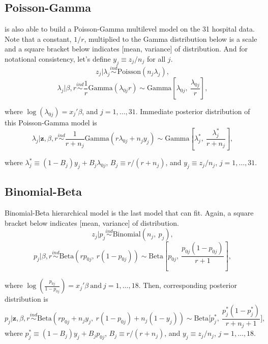 \documentclass[article]{jss}
\begin{document}
\subsection[Poisson-Gamma]{Poisson-Gamma}
 is also able to build a Poisson-Gamma multilevel model on the 31 hospital data. Note that a constant, $1/r$, multiplied to the Gamma distribution below is a scale and a square bracket below indicates [mean, variance] of distribution. And for notational consistency, let's define $y_{j}\equiv z_{j} / n_{j}$ for all $j$.
\begin{equation}
z_{j}\vert \lambda_{j} \stackrel{ind}{\sim}\textrm{Poisson}(n_{j}\lambda_{j}),
\end{equation}
\begin{equation}
\lambda_{j}\vert \beta, r\stackrel{ind}{\sim}\frac{1}{r}\textrm{Gamma}(\lambda_{0j}r)\sim \textrm{Gamma}[\lambda_{0j}, ~\frac{\lambda_{0j}}{r}],
\end{equation}

where $\log(\lambda_{0j}) =x_{j}'\beta$, and $j=1, \ldots, 31$. Immediate posterior distribution of this Poisson-Gamma model is
\begin{equation}
\lambda_{j}\vert \textbf{z}, \beta, r \stackrel{ind}{\sim}\frac{1}{r + n_{j}}\textrm{Gamma}(r\lambda_{0j} + n_{j}y_{j})\sim\textrm{Gamma}[\lambda^{\ast}_{j},~\frac{\lambda^{\ast}_{j}}{r+n_{j}}],
\end{equation}

where $\lambda^{\ast}_{j} \equiv (1-B_{j})y_{j} + B_{j}\lambda_{0j}$,  $B_{j}\equiv r / (r+n_{j})$, and $y_{j}\equiv z_{j} / n_{j}$, $j=1, \ldots, 31$. 

\subsection[Binomial-Beta]{Binomial-Beta}
Binomial-Beta hierarchical model is the last model that  can fit. Again, a square bracket below indicates [mean, variance] of distribution.
\begin{equation}
z_{j} \vert p_{j}\stackrel{ind}{\sim}\textrm{Binomial}(n_{j}, ~p_{j}),
\end{equation}
\begin{equation}
p_{j} \vert \beta, r\stackrel{ind}{\sim}\textrm{Beta}(rp_{0j},~ r(1-p_{0j}))\sim \textrm{Beta}[p_{0j}, ~\frac{p_{0j}(1-p_{0j})}{r + 1}],
\end{equation}

where $\log(\frac{p_{0j}}{1-p_{0j}}) =x_{j}'\beta~\textrm{and}~j=1, \ldots, 18$. Then, corresponding posterior distribution is
\begin{equation}
p_{j}\vert \textbf{z}, \beta, r \stackrel{ind}{\sim}\textrm{Beta}(rp_{0j}+n_{j}y_{j},~r(1-p_{0j})+n_{j}(1-y_{j}))\sim\textrm{Beta}\bigg[p^{\ast}_{j},~ \frac{p^{\ast}_{j}(1-p^{\ast}_{j})}{r+n_{j}+1}\bigg],
\end{equation}
where $p^{\ast}_{j}\equiv(1-B_{j})y_{j}+B_{j}p_{0j}$, $B_{j}\equiv r/ (r+n_{j})$, and $y_{j}\equiv z_{j} / n_{j}$, $j=1,\ldots,18$.
\end{document}
